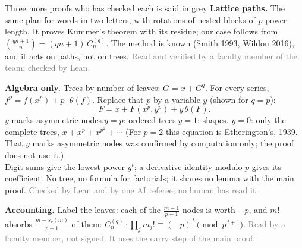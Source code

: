 \documentclass[aspectratio=169,11pt]{beamer}
\newcommand{\sd}{s_p}
\newcommand{\Cq}{C_n^{(q)}}
\begin{document}
\begin{frame}{Three more proofs \hfill\normalsize\textcolor{red!70!black}{who has checked each is said in grey}}
  \small
  \textbf{Lattice paths.} The same plan for words in two letters, with rotations of nested blocks of
  $p$-power length. It proves Kummer's theorem with its residue; our case follows from
  $\binom{qn+1}{n}=(qn+1)\,\Cq$. The method is known (Smith 1993, Wildon 2016), and it acts on paths, not on trees.
  {\footnotesize\textcolor{gray}{Read and verified by a faculty member of the team; checked by Lean.}}

  \textbf{Algebra only.} Trees by number of leaves: $G=x+G^q$.
  For every series, $f^p=f(x^p)+p\cdot\theta(f)$. Replace that $p$ by a variable $y$ (shown for $q=p$):
  \[ F=x+F(x^p,y^p)+y\,\theta(F). \]
  {\footnotesize $y$ marks asymmetric nodes.\quad $y=p$: ordered trees.\quad $y=1$: shapes.\quad
  $y=0$: only the complete trees, $x+x^p+x^{p^2}+\cdots$\quad
  (For $p=2$ this equation is Etherington's, 1939. That $y$ marks asymmetric nodes was confirmed by
  computation only; the proof does not use it.)}\\[2pt]
  Digit sums give the lowest power $y^t$; a derivative identity modulo $p$ gives its coefficient.
  No tree, no formula for factorials; it shares no lemma with the main proof.
  {\footnotesize\textcolor{gray}{Checked by Lean and by one AI referee; no human has read it.}}

  \textbf{Accounting.} Label the leaves: each of the $\frac{m-1}{p-1}$ nodes is worth
  $-p$, and $m!$ absorbs $\frac{m-\sd(m)}{p-1}$ of them:\quad
  $\Cq\cdot\prod_j m_j!\equiv(-p)^{\,t}\pmod{p^{\,t+1}}$.
  {\footnotesize\textcolor{gray}{Read by a faculty member, not signed. It uses the carry step of the main proof.}}
\end{frame}
\end{document}
